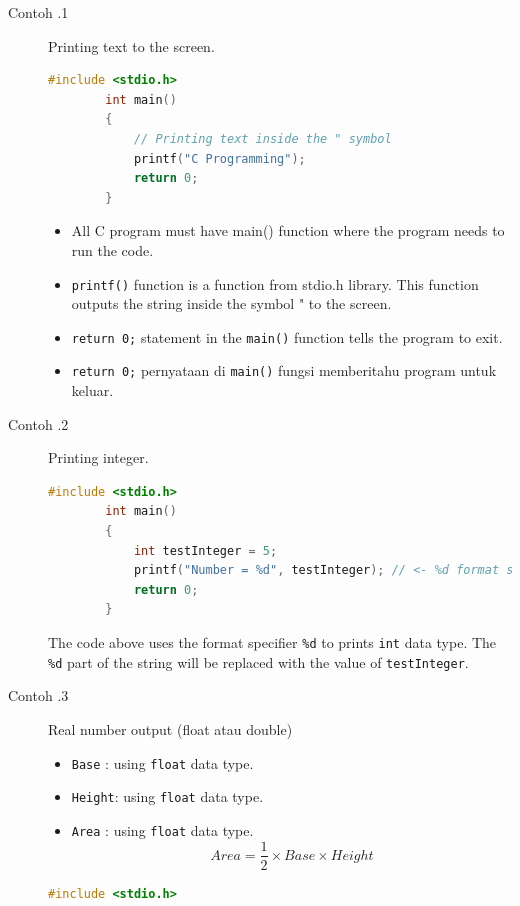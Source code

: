 \begin{description}
	\item[Contoh \thesubsection.1]  Printing text to the screen.
		\begin{lstlisting}[language=c,caption = Print text "C Programming" Ke layar,captionpos=t]
		#include <stdio.h>    
		int main()
		{ 
			// Printing text inside the " symbol
			printf("C Programming");
			return 0;
		}
	\end{lstlisting}
		\begin{itemize}
			\item All C program must have main() function where the program needs to run the code.
			\item \verb*|printf()| function is a function from stdio.h library. This function outputs the string inside the symbol " to the screen.
			\item \verb*|return 0;| statement in the \verb*|main()| function tells the program to exit.
			\item \verb*|return 0;| pernyataan di \verb*|main()| fungsi memberitahu program untuk keluar.
		\end{itemize}
	\item [Contoh \thesubsection.2] Printing integer.
	      \begin{lstlisting}[language=c,captionpos=t]
		#include <stdio.h>
		int main()
		{
			int testInteger = 5;
			printf("Number = %d", testInteger); // <- %d format string
			return 0;
		}
	\end{lstlisting}


	      The code above uses the format specifier \verb*|%d| to prints \verb*|int| data type. The \verb*|%d| part of the string will be replaced with the value of \verb*|testInteger|.

	\item[Contoh \thesubsection.3] Real number output (float atau double)
		\begin{itemize}\label{eq:LuasSegitiga}
			\item \verb|Base|  : using \verb|float| data type.
			\item \verb|Height|: using \verb|float| data type.
			\item \verb|Area|  : using \verb|float| data type.
			      \begin{equation}
				      Area = \frac{1}{2} \times Base \times Height
			      \end{equation}
		\end{itemize}
		\begin{lstlisting}[language=c,captionpos=t]
		#include <stdio.h>
		

\end{lstlisting}
\end{description}
